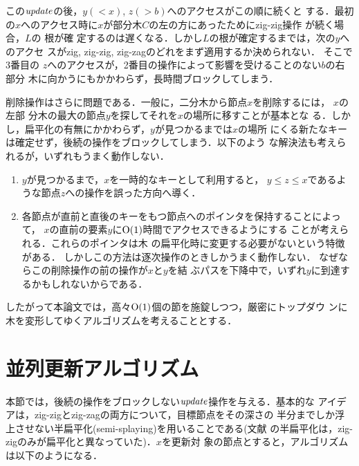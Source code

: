 \documentclass[T]{compsoft}
\begin{document}
この${\it update\/}$の後，$y(<x)$, $z(>b)$へのアクセスがこの順に続くと
する．最初の$x$へのアクセス時に$x$が部分木$C$の左の方にあったためにzig-zig操作
が続く場合，$L$の
根が確
定するのは遅くなる．しかし$L$の根が確定するまでは，次の$y$へのアクセ
スがzig, zig-zig, zig-zagのどれをまず適用するか決められない．
% 
%
そこで3番目の
$z$へのアクセスが，2番目の操作によって影響を受けることのない$b$の右部分
木に向かうにもかかわらず，長時間ブロックしてしまう．

削除操作はさらに問題である．一般に，二分木から節点$x$を削除するには，
$x$の左部
分木の最大の節点$y$を探してそれを$x$の場所に移すことが基本とな
る．しかし，扁平化の有無にかかわらず，$y$が見つかるまでは$x$の場所
にくる新たなキーは確定せず，後続の操作をブロックしてしまう．以下のよう
な解決法も考えられるが，いずれもうまく動作しない．

\begin{enumerate}
\item %
$y$が見つかるまで，$x$を一時的なキーとして利用すると，
$y\le z\le x$であるような節点$z$への操作を誤った方向へ導く．

\item %
各節点が直前と直後のキーをもつ節点へのポインタを保持することによって，
$x$の直前の要素$y$に${\rm O}(1)$時間でアクセスできるようにする
ことが考えられる．これらのポインタは木
の扁平化時に変更する必要がないという特徴がある．
% 
しかしこの方法は逐次操作のときしかうまく動作しない．
% 
%
なぜならこの削除操作の前の操作が$x$と$y$を結
ぶパスを下降中で，いずれ$y$に到達するかもしれないからである．
\end{enumerate}

したがって本論文では，高々${\rm O}(1)$個の節を施錠しつつ，厳密にトップダウ
ンに木を変形してゆくアルゴリズムを考えることとする．

\section{並列更新アルゴリズム}\label{section:update}

本節では，後続の操作をブロックしない${\it update\/}$操作を与える．基本的な
アイデアは，zig-zigとzig-zagの両方について，目標節点をその深さの
半分までしか浮上させない半扁平化(semi-splaying)を用いることである(文献
\cite{ST85}の半扁平化は，zig-zigのみが扁平化と異なっていた)．$x$を更新対
象の節点とすると，アルゴリズムは以下のようになる．
%
\end{document}
